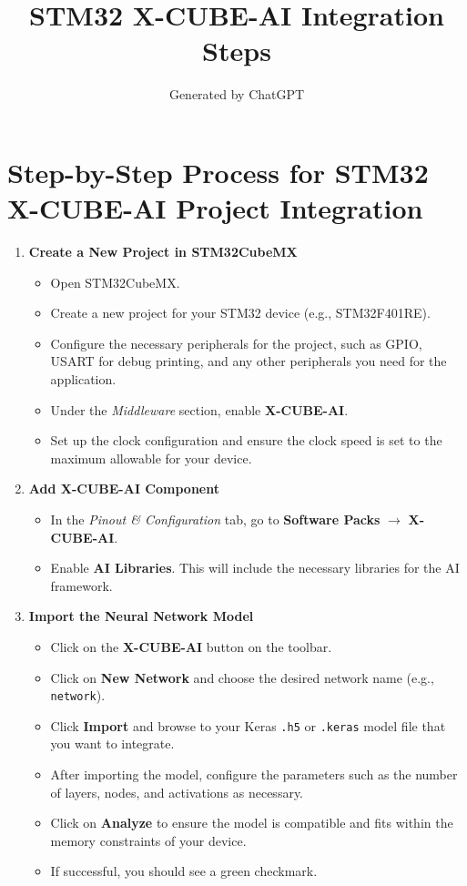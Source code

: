 \documentclass{article}
\title{STM32 X-CUBE-AI Integration Steps}
\author{Generated by ChatGPT}
\date{}
\begin{document}
\maketitle

\section*{Step-by-Step Process for STM32 X-CUBE-AI Project Integration}

\begin{enumerate}
    \item \textbf{Create a New Project in STM32CubeMX}
    \begin{itemize}
        \item Open STM32CubeMX.
        \item Create a new project for your STM32 device (e.g., STM32F401RE).
        \item Configure the necessary peripherals for the project, such as GPIO, USART for debug printing, and any other peripherals you need for the application.
        \item Under the \textit{Middleware} section, enable \textbf{X-CUBE-AI}.
        \item Set up the clock configuration and ensure the clock speed is set to the maximum allowable for your device.
    \end{itemize}

    \item \textbf{Add X-CUBE-AI Component}
    \begin{itemize}
        \item In the \textit{Pinout \& Configuration} tab, go to \textbf{Software Packs} $\rightarrow$ \textbf{X-CUBE-AI}.
        \item Enable \textbf{AI Libraries}. This will include the necessary libraries for the AI framework.
    \end{itemize}

    \item \textbf{Import the Neural Network Model}
    \begin{itemize}
        \item Click on the \textbf{X-CUBE-AI} button on the toolbar.
        \item Click on \textbf{New Network} and choose the desired network name (e.g., \texttt{network}).
        \item Click \textbf{Import} and browse to your Keras \texttt{.h5} or \texttt{.keras} model file that you want to integrate.
        \item After importing the model, configure the parameters such as the number of layers, nodes, and activations as necessary.
        \item Click on \textbf{Analyze} to ensure the model is compatible and fits within the memory constraints of your device.
        \item If successful, you should see a green checkmark.
    \end{itemize}


\end{enumerate}
\end{document}
